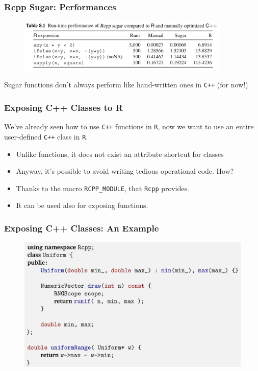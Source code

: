 \documentclass{beamer}
\def\code#1{\texttt{#1}} %
\begin{document}
\begin{frame}
\frametitle{Rcpp Sugar: Performances}

\begin{figure}[s3]
    \includegraphics[width=0.9\textwidth]{sugar_hand_r.png}
\end{figure}

Sugar functions don't always perform like hand-written ones in \code{C++} (for now!)

\end{frame}


\begin{frame}
\frametitle{Exposing C++ Classes to R}
We've already seen how to use \code{C++} functions in \code{R}, now we want to 
use an entire user-defined \code{C++} class in \code{R}.

\begin{itemize}
    \item<1-> Unlike functions, it does not exist an attribute shortcut for classes
    \item<2-> Anyway, it's possible to avoid writing tedious operational code. How?
    \item<3-> Thanks to the macro \code{RCPP\_MODULE}, that \code{Rcpp} provides.
    \item<4-> It can be used also for exposing functions.
    
\end{itemize}
\end{frame}


\begin{frame}
\frametitle{Exposing C++ Classes: An Example}

\begin{figure}[s2]
    \includegraphics[width=1\textwidth]{exposing_classes_1.png}
\end{figure}
\end{frame}
\end{document}
